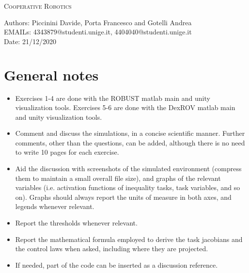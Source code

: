 \documentclass{article}
\makeatletter
\newcommand\frontmatter{%
    \cleardoublepage
  \pagenumbering{roman}}
\newcommand\mainmatter{%
    \cleardoublepage
  \pagenumbering{arabic}}
\makeatother
\begin{document}
\frontmatter
\onecolumn
\vskip 1cm
\begin{center}
\huge \textsc{Cooperative Robotics}\\
\vskip 1cm

\skip 0.5cm

\vskip 5cm

\normalsize
Authors: Piccinini Davide, Porta Francesco and Gotelli Andrea \\
EMAILs: 4343879@studenti.unige.it, 4404040@studenti.unige.it \\
Date: 21/12/2020
\end{center}
\clearpage
\mainmatter
\section*{General notes}

\begin{itemize}
	\item Exercises 1-4 are done with the ROBUST matlab main and unity visualization tools. Exercises 5-6 are done with the DexROV matlab main and unity visualization tools.
	\item Comment and discuss the simulations, in a concise scientific manner. Further comments, other than the questions, can be added, although there is no need to write 10 pages for each exercise.
	\item Aid the discussion with screenshots of the simulated environment (compress them to maintain a small overall file size), and graphs of the relevant variables (i.e. activation functions of inequality tasks, task variables, and so on). Graphs should always report the units of measure in both axes, and legends whenever relevant.
	\item Report the thresholds whenever relevant.
	\item Report the mathematical formula employed to derive the task jacobians and the control laws when asked, including where they are projected.
	\item If needed, part of the code can be inserted as a discussion reference.
\end{itemize}
\end{document}
